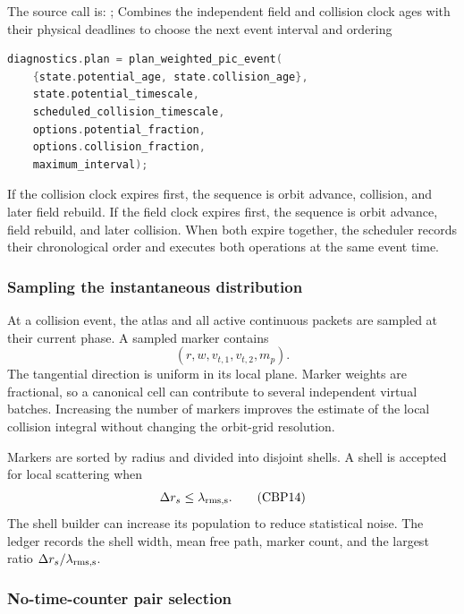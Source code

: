 The source call is:
{;
 }
{Combines the independent field and collision clock ages with their physical
 deadlines to choose the next event interval and ordering}
\begin{lstlisting}[language=C++]
diagnostics.plan = plan_weighted_pic_event(
    {state.potential_age, state.collision_age},
    state.potential_timescale,
    scheduled_collision_timescale,
    options.potential_fraction,
    options.collision_fraction,
    maximum_interval);
\end{lstlisting}

If the collision clock expires first, the sequence is orbit advance,
collision, and later field rebuild.  If the field clock expires first, the
sequence is orbit advance, field rebuild, and later collision.  When both
expire together, the scheduler records their chronological order and executes
both operations at the same event time.

\subsubsection{Sampling the instantaneous distribution}

At a collision event, the atlas and all active continuous packets are sampled
at their current phase.  A sampled marker contains
\[
  (r,w,v_{t,1},v_{t,2},m_p).                             \tag{CBP13}
\]
The tangential direction is uniform in its local plane.  Marker weights are
fractional, so a canonical cell can contribute to several independent virtual
batches.  Increasing the number of markers improves the estimate of the local
collision integral without changing the orbit-grid resolution.

Markers are sorted by radius and divided into disjoint shells.  A shell is
accepted for local scattering when
\[
  \Delta r_s\le\lambda_{\rm rms,s}.                     \tag{CBP14}
\]
The shell builder can increase its population to reduce statistical noise.
The ledger records the shell width, mean free path, marker count, and the
largest ratio \(\Delta r_s/\lambda_{\rm rms,s}\).

\subsubsection{No-time-counter pair selection}

